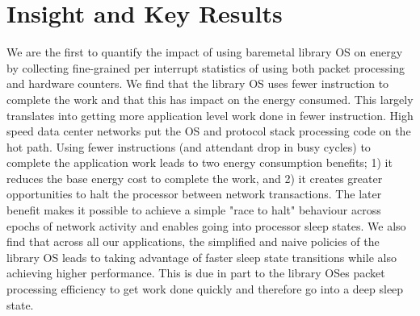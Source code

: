 \documentclass[pageno]{jpaper}
\begin{document}
\section{Insight and Key Results}
We are the first to quantify the impact of using baremetal library OS on energy by collecting fine-grained per interrupt statistics of using both packet processing and hardware counters.  We find that the library OS uses fewer instruction to complete the work and that this has impact on the energy consumed.  This largely translates into getting more application level work done in fewer instruction.  High speed data center networks put the OS and protocol stack processing code on the hot path. Using fewer instructions (and attendant drop in busy cycles) to complete the application work leads to two energy consumption benefits; 1) it reduces the base energy cost to complete the work, and 2) it creates greater opportunities to halt the processor between network transactions.  The later benefit makes it possible to achieve a simple "race to halt" behaviour across epochs of network activity and enables going into processor sleep states. We also find that across all our applications, the simplified and naive policies of the library OS leads to taking advantage of faster sleep state transitions while also achieving higher performance. This is due in part to the library OSes packet processing efficiency to get work done quickly and therefore go into a deep sleep state.

\end{document}
